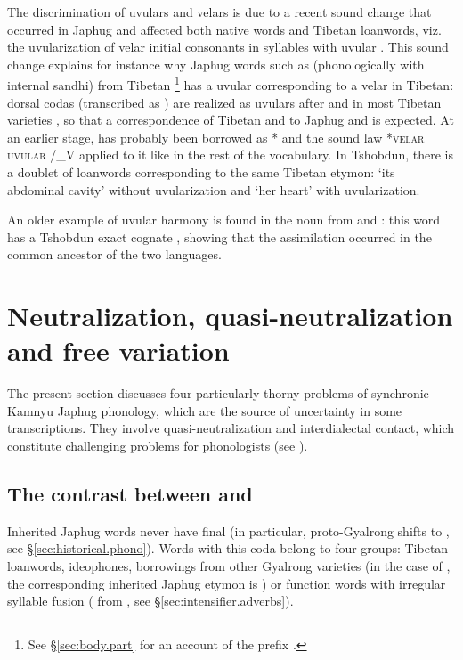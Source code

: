 The discrimination of uvulars and velars is due to a recent sound change that occurred in Japhug and affected both native words and Tibetan loanwords, viz. the uvularization of velar initial consonants in syllables with uvular . This sound change explains for instance why Japhug words such as  (phonologically  with internal sandhi) from Tibetan \footnote{See §\ref{sec:body.part} for an account of the prefix .} has a uvular  corresponding to a velar  in Tibetan: dorsal codas (transcribed as ) are realized as uvulars after  and  in most Tibetan varieties \citep{gong16amdo}, so that a correspondence of Tibetan  and  to Japhug  and  is expected. At an earlier stage,  has probably been borrowed as * and the sound law *\textsc{velar} \fl{} \textsc{uvular} /\_V applied to it like in the rest of the vocabulary. In Tshobdun, there is a doublet of loanwords corresponding to the same Tibetan etymon:    `its abdominal cavity' \citep[413]{jackson19tshobdun} without uvularization and  `her heart' \citep[704]{jackson19tshobdun} with uvularization.

An older example of uvular harmony is found in the noun  from  and : this word has a Tshobdun exact cognate  \citep[172]{jackson19tshobdun}, showing that the assimilation occurred in the common ancestor of the two languages.

\section{Neutralization, quasi-neutralization and free variation}
The present section discusses four particularly thorny problems of synchronic Kamnyu Japhug phonology, which are the source of uncertainty in some transcriptions. They involve quasi-neutralization and interdialectal contact, which constitute challenging problems for phonologists (see \citealt{michaud06neutralisation}). 

\subsection{The contrast between  and } \label{sec:aN.oN.free}
Inherited Japhug words never have final  (in particular, proto-Gyalrong  shifts to , see §\ref{sec:historical.phono}). Words with this coda belong to four groups: Tibetan loanwords, ideophones, borrowings from other Gyalrong varieties (in the case of , the corresponding inherited Japhug etymon is ) or function words with irregular syllable fusion ( from , see §\ref{sec:intensifier.adverbs}).

